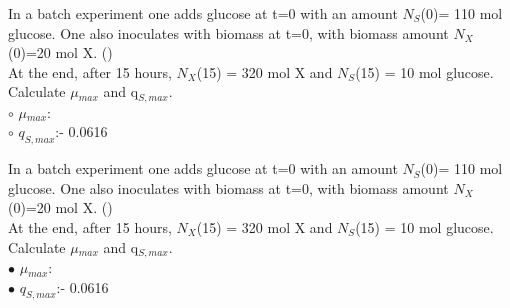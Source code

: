 \documentclass[]{beamer}
\begin{document}
\begin{frame}[shrink] {}
\color{blue}
In a batch experiment one adds glucose at t=0 with an amount $N_{S}$(0)= 110 mol glucose. One also inoculates with biomass at t=0, with biomass amount $N_{X}$(0)=20 mol X. ({\color{green}{Q9}})\\
At the end, after 15 hours, $N_{X}$(15) = 320 mol X and $N_{S}$(15) = 10 mol glucose.  \\
Calculate $\mu$$_{max}$ and q$_{S,max}$.  \\[.5em]
\color{black}
\setlength{\parindent}{-0.4cm}
{\color{red}$\circ$} $\mu$$_{max}$:  \\
{\color{red}$\circ$} $q_{S,max}$:\quad - 0.0616 \\
\end{frame}
\begin{frame}[shrink] {}
\color{blue}
In a batch experiment one adds glucose at t=0 with an amount $N_{S}$(0)= 110 mol glucose. One also inoculates with biomass at t=0, with biomass amount $N_{X}$(0)=20 mol X. ({\color{green}{Q9}})\\
At the end, after 15 hours, $N_{X}$(15) = 320 mol X and $N_{S}$(15) = 10 mol glucose.  \\
Calculate $\mu$$_{max}$ and q$_{S,max}$.  \\[.5em]
\color{black}
\setlength{\parindent}{-0.4cm}
{\color{red}$\bullet$} $\mu$$_{max}$:  \\
{\color{red}$\bullet$} $q_{S,max}$:\quad - 0.0616 \\
\end{frame}
\end{document}
